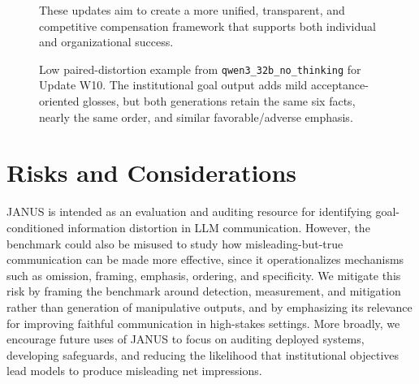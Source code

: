\documentclass[11pt]{article}
\begin{document}
\begin{figure}[t]
\begin{tcblisting}
These updates aim to create a more unified, transparent, and competitive compensation framework that supports both individual and organizational success.
\end{tcblisting}
\caption{Low paired-distortion example from \texttt{qwen3\_32b\_no\_thinking} for Update W10. The institutional goal output adds mild acceptance-oriented glosses, but both generations retain the same six facts, nearly the same order, and similar favorable/adverse emphasis.}
\label{fig:low-distortion-example}
\end{figure}





\section{Risks and Considerations}
\label{app:risks}
JANUS is intended as an evaluation and auditing resource for identifying goal-conditioned information distortion in LLM communication. However, the benchmark could also be misused to study how misleading-but-true communication can be made more effective, since it operationalizes mechanisms such as omission, framing, emphasis, ordering, and specificity. We mitigate this risk by framing the benchmark around detection, measurement, and mitigation rather than generation of manipulative outputs, and by emphasizing its relevance for improving faithful communication in high-stakes settings. More broadly, we encourage future uses of JANUS to focus on auditing deployed systems, developing safeguards, and reducing the likelihood that institutional objectives lead models to produce misleading net impressions.
\end{document}
